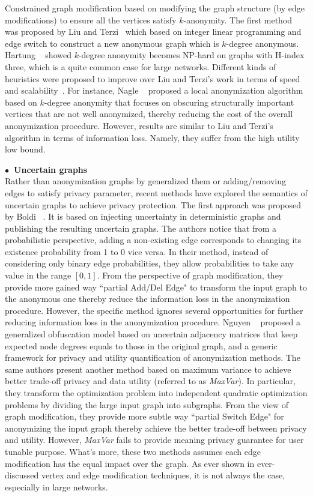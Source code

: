 Constrained graph modification based on modifying the graph structure (by edge modifications) to ensure all the vertices satisfy $k$-anonymity. The first method was proposed by Liu and Terzi~\cite{Liu_Towards_2008} which based on integer linear programming and edge switch  to construct a new anonymous graph which is $k$-degree anonymous. Hartung {\etal}~\cite{Hartung_Theory_2015} showed $k$-degree anonymity becomes NP-hard on graphs with H-index three, which is a quite common case for large networks. Different kinds of heuristics were proposed to improve over Liu and Terzi's work in terms of speed and scalability~\cite{Nagle_EWNI_2012,}. For instance, Nagle {\etal}~\cite{Nagle_EWNI_2012} proposed a local anonymization algorithm based on $k$-degree anonymity that focuses on obscuring structurally important vertices that are not well anonymized, thereby reducing the cost of the overall anonymization procedure. However, results are similar to Liu and Terzi's algorithm in terms of information loss. Namely, they suffer from the high utility low bound. 

\hspace{-2em}\textbf{$\bullet$~Uncertain graphs}\\
Rather than anonymization graphs by generalized them or adding/removing edges to satisfy privacy parameter, recent methods have explored the semantics of uncertain graphs to achieve privacy protection. The first approach was proposed by Boldi {\etal}~\cite{Boldi_Injecting_2012}. It is based on injecting uncertainty in deterministic graphs and publishing the resulting uncertain graphs. The authors notice that from a probabilistic perspective, adding a non-existing edge corresponds to changing its existence probability from 1 to 0 vice versa. In their method, instead of considering only binary edge probabilities, they allow probabilities to take any value in the range $[0,1]$. From the perspective of graph modification, they provide more gained way ``partial Add/Del Edge" to transform the input graph to the anonymous one thereby reduce the information loss in the anonymization procedure. However, the specific method ignores several opportunities for further reducing information loss in the anonymization procedure. Nguyen {\etal}~\cite{Nguyen_Anonymizing_2015} proposed a generalized obfuscation model based on uncertain adjacency matrices that keep expected node degrees equals to those in the original graph, and a generic framework for privacy and utility quantification of anonymization methods. The same authors present another method based on maximum variance to achieve better trade-off privacy and data utility (referred to as {\em MaxVar}). In particular, they transform the optimization problem into independent quadratic optimization problems by dividing the large input graph into subgraphs. From the view of graph modification, they provide more subtle way ``partial Switch Edge" for anonymizing the input graph thereby achieve the better trade-off between privacy and utility. However, {\em MaxVar} fails to provide meaning privacy guarantee for user tunable purpose. 
What's more, these two methods assumes each edge modification has the equal impact over the graph. As ever shown in ever-discussed vertex and edge modification techniques, it is not always the case, especially in large networks. 
